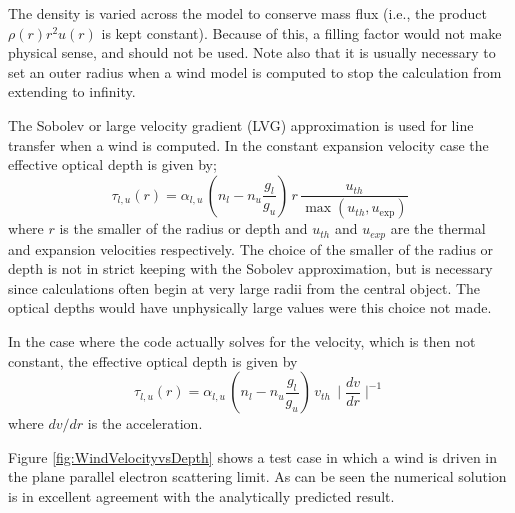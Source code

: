 The density is varied across the model to conserve mass flux (i.e., the
product $\rho(r) r^2 u(r)$ is kept constant).  Because of this, a filling factor
would not make physical sense, and should not be used.  Note also that it
is usually necessary to set an outer radius when a wind model is computed
to stop the calculation from extending to infinity.

The Sobolev or large velocity gradient (LVG) approximation is used
for line transfer when a wind is computed.  In the constant expansion
velocity case the effective optical depth is given by;
\begin{equation}
{\tau _{l,u}}(r) = {\alpha _{l,u}}\,\left( {{n_l} -
{n_u}\frac{{{g_l}}}{{{g_u}}}} \right)\,r\,\frac{{{u_{th}}}}{{\max
({u_{th}},{u_{\exp }})}}
\end{equation}
where $r$ is the smaller of the radius or depth and $u_{th}$ and $u_{exp}$ are the
thermal and expansion velocities respectively.  The choice of the smaller
of the radius or depth is not in strict keeping with the Sobolev
approximation, but is necessary since calculations often begin at very large
radii from the central object.  The optical depths would have unphysically
large values were this choice not made.

In the case where the code actually solves for the velocity, which is
then not constant, the effective optical depth is given by
\citep{Castor1975}
\begin{equation}
\tau _{l,u}(r) = \alpha _{l,u}\,\left( n_l -
n_u\frac{g_l}{g_u}\right)\,v_{th}\,\mid
\frac{dv}{dr} \mid ^{ - 1}
\end{equation}
where $dv/dr$ is the acceleration.

Figure \ref{fig:WindVelocityvsDepth} shows a test case in which a wind is driven in the plane parallel
electron scattering limit.  As can be seen the numerical solution is in
excellent agreement with the analytically predicted result.

